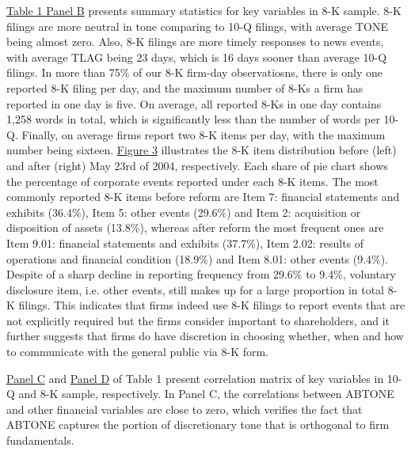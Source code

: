 \documentclass[a4paper]{article}
\begin{document}
\begin{spacing}{2}
\hyperref[T1PB]{Table 1 Panel B} presents summary statistics for key variables in 8-K sample. 8-K filings are more neutral in tone comparing to 10-Q filings, with average TONE being almost zero. Also, 8-K filings are more timely responses to news events, with average TLAG being 23 days, which is 16 days sooner than average 10-Q filings. In more than 75\% of our 8-K firm-day observatiosns, there is only one reported 8-K filing per day, and the maximum number of 8-Ks a firm has reported in one day is five. On average, all reported 8-Ks in one day contains 1,258 words in total, which is significantly less than the number of words per 10-Q. Finally, on average firms report two 8-K items per day, with the maximum number being sixteen. \hyperref[fig3]{Figure 3} illustrates the 8-K item distribution before (left) and after (right) May 23rd of 2004, respectively. Each share of pie chart shows the percentage of corporate events reported under each 8-K items. The most commonly reported 8-K items before reform are Item 7: financial statements and exhibits (36.4\%), Item 5: other events (29.6\%) and Item 2: acquisition or disposition of assets (13.8\%), whereas after reform the most frequent ones are Item 9.01: financial statements and exhibits (37.7\%), Item 2.02: results of operations and financial condition (18.9\%) and Item 8.01: other events (9.4\%). Despite of a sharp decline in reporting frequency from 29.6\% to 9.4\%, voluntary disclosure item, i.e. other events, still makes up for a large proportion in total 8-K filings. This indicates that firms indeed use 8-K filings to report events that are not explicitly required but the firms consider important to shareholders, and it further suggests that firms do have discretion in choosing whether, when and how to communicate with the general public via 8-K form. 

\hyperref[T1PC]{Panel C} and \hyperref[T1PD]{Panel D} of Table 1 present correlation matrix of key variables in 10-Q and 8-K sample, respectively. In Panel C, the correlations between ABTONE and other financial variables are close to zero, which verifies the fact that ABTONE captures the portion of discretionary tone that is orthogonal to firm fundamentals. 


\end{spacing}
\end{document}
